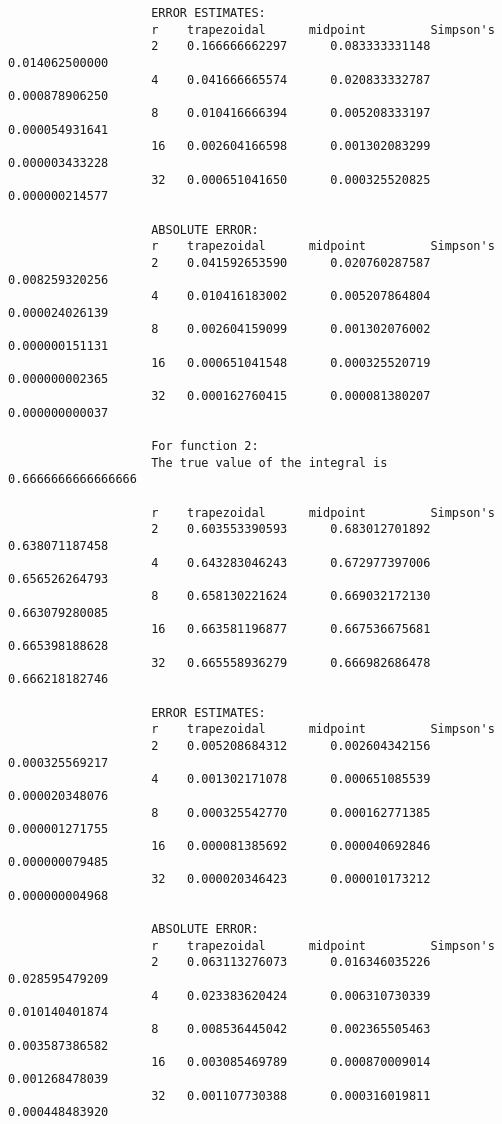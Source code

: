 \documentclass{article}
\begin{document}
\begin{enumerate}[label = {\arabic*}]
\begin{multicols}{2}
\begin{scriptsize}
\begin{verbatim}
					ERROR ESTIMATES:
					r    trapezoidal      midpoint         Simpson's
					2    0.166666662297 	 0.083333331148 	 0.014062500000 
					4    0.041666665574 	 0.020833332787 	 0.000878906250 
					8    0.010416666394 	 0.005208333197 	 0.000054931641 
					16 	 0.002604166598 	 0.001302083299 	 0.000003433228 
					32 	 0.000651041650 	 0.000325520825 	 0.000000214577 
					
					ABSOLUTE ERROR:
					r    trapezoidal      midpoint         Simpson's
					2    0.041592653590 	 0.020760287587 	 0.008259320256 
					4    0.010416183002 	 0.005207864804 	 0.000024026139 
					8    0.002604159099 	 0.001302076002 	 0.000000151131 
					16 	 0.000651041548 	 0.000325520719 	 0.000000002365 
					32 	 0.000162760415 	 0.000081380207 	 0.000000000037 
					
					For function 2:
					The true value of the integral is  0.6666666666666666
					
					r    trapezoidal      midpoint         Simpson's
					2    0.603553390593 	 0.683012701892 	 0.638071187458 
					4    0.643283046243 	 0.672977397006 	 0.656526264793 
					8    0.658130221624 	 0.669032172130 	 0.663079280085 
					16 	 0.663581196877 	 0.667536675681 	 0.665398188628 
					32 	 0.665558936279 	 0.666982686478 	 0.666218182746 
					
					ERROR ESTIMATES:
					r    trapezoidal      midpoint         Simpson's
					2    0.005208684312 	 0.002604342156 	 0.000325569217 
					4    0.001302171078 	 0.000651085539 	 0.000020348076 
					8    0.000325542770 	 0.000162771385 	 0.000001271755 
					16 	 0.000081385692 	 0.000040692846 	 0.000000079485 
					32 	 0.000020346423 	 0.000010173212 	 0.000000004968 
					
					ABSOLUTE ERROR:
					r    trapezoidal      midpoint         Simpson's
					2    0.063113276073 	 0.016346035226 	 0.028595479209 
					4    0.023383620424 	 0.006310730339 	 0.010140401874 
					8    0.008536445042 	 0.002365505463 	 0.003587386582 
					16 	 0.003085469789 	 0.000870009014 	 0.001268478039 
					32 	 0.001107730388 	 0.000316019811 	 0.000448483920 
				\end{verbatim}
			\end{scriptsize}	
			\color{black}
		\end{multicols}
		

\end{enumerate}
\end{document}
